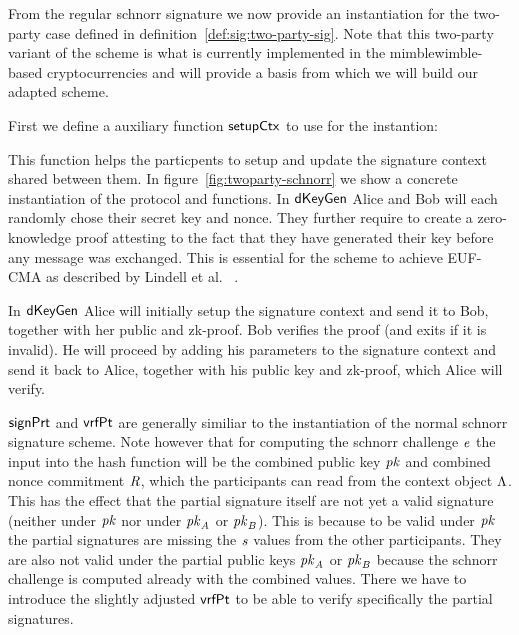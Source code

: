 From the regular schnorr signature we now provide an instantiation for the two-party case defined in definition~\ref{def:sig:two-party-sig}. Note that this two-party variant of the scheme is what is
currently implemented in the mimblewimble-based cryptocurrencies and will provide a basis from which we will build our adapted scheme.

First we define a auxiliary function $\mathsf{setupCtx}$ to use for the instantion:

\begin{center}
    \fbox{
    \begin{varwidth}{\textwidth}
        \procedure[linenumbering]{$\procSetupCtx{\varSigContext}{\varPubKeyAlice}{\varRandAlice}$} {
        \opAccess{\varSigContext}{\varPubKey} \opAssign \opAccess{\varSigContext}{\varPubKey} \opAddPoint \varPubKeyAlice \\
        \opAccess{\varSigContext}{\varRand} \opAssign \opAccess{\varSigContext}{\varRand} \opAddPoint \varRandAlice \\
        \pcreturn \varSigContext
        } \\
    \end{varwidth}
    }
\end{center}

This function helps the particpents to setup and update the signature context shared between them. In figure~\ref{fig:twoparty-schnorr} we show a concrete instantiation of the protocol and functions. In $\mathsf{dKeyGen}$ Alice
and Bob will each randomly chose their secret key and nonce. They further require to create a zero-knowledge proof attesting to the fact that they have generated their key before any message was exchanged. This
is essential for the scheme to achieve EUF-CMA as described by Lindell et al. ~\cite{lindell2017fast}.

In $\mathsf{dKeyGen}$ Alice will initially setup the signature context and send it to Bob, together with her public and zk-proof.
Bob verifies the proof (and exits if it is invalid). He will proceed by adding his parameters to the signature context and send it back to Alice, together with his public key and zk-proof, which Alice will verify.

$\mathsf{signPrt}$ and $\mathsf{vrfPt}$ are generally similiar to the instantiation of the normal schnorr signature scheme. Note however that for computing the schnorr challenge $\mathit{e}$ the input into
the hash function will be the combined public key $\mathit{pk}$ and combined nonce commitment $\mathit{R}$, which the participants can read from the context object $\Lambda$. This has the effect that the partial
signature itself are not yet a valid signature (neither under $\mathit{pk}$ nor under $\mathit{pk}_{\mathit{A}}$ or $\mathit{pk}_{\mathit{B}}$). This is because to be valid under $\mathit{pk}$ the partial signatures are missing the $\mathit{s}$ values
from the other participants. They are also not valid under the partial public keys $\mathit{pk}_{\mathit{A}}$ or $\mathit{pk}_{\mathit{B}}$ because the schnorr challenge is computed already with the combined values. There we have
to introduce the slightly adjusted $\mathsf{vrfPt}$ to be able to verify specifically the partial signatures.

